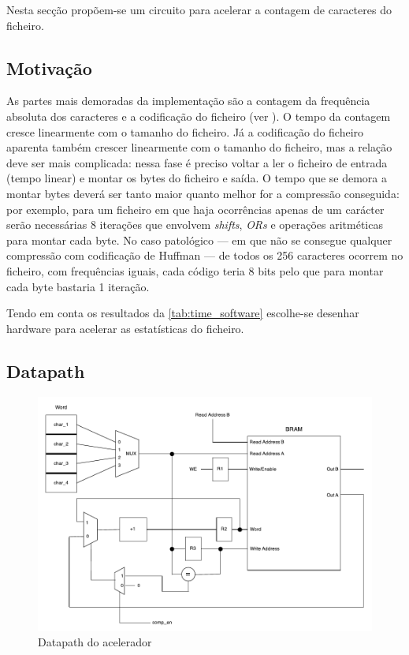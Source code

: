 Nesta secção propõem-se um circuito para acelerar a contagem de caracteres do ficheiro.

\subsection{Motivação}
  As partes mais demoradas da implementação são a contagem da frequência absoluta dos caracteres e a codificação do ficheiro (ver ). O tempo da contagem cresce linearmente com o tamanho do ficheiro. Já a codificação do ficheiro aparenta também crescer linearmente com o tamanho do ficheiro, mas a relação deve ser mais complicada: nessa fase é preciso voltar a ler o ficheiro de entrada (tempo linear) e montar os bytes do ficheiro e saída. O tempo que se demora a montar bytes deverá ser tanto maior quanto melhor for a compressão conseguida: por exemplo, para um ficheiro em que haja ocorrências apenas de um carácter serão necessárias 8 iterações que envolvem \textit{shifts}, \textit{ORs} e operações aritméticas para montar cada byte. No caso patológico --- em que não se consegue qualquer compressão com codificação de Huffman --- de todos os 256 caracteres ocorrem no ficheiro, com frequências iguais, cada código teria 8 bits pelo que para montar cada byte bastaria 1 iteração.

  Tendo em conta os resultados da \autoref{tab:time_software} escolhe-se desenhar hardware para acelerar as estatísticas do ficheiro.

  \subsection{Datapath}

  \begin{figure}[h]
    \centerline{
    	\includegraphics[width=0.65\paperwidth]{img/hw_datapath}
    }
    \caption{Datapath do acelerador}
    \label{fig:hw_datapath}
  \end{figure}

